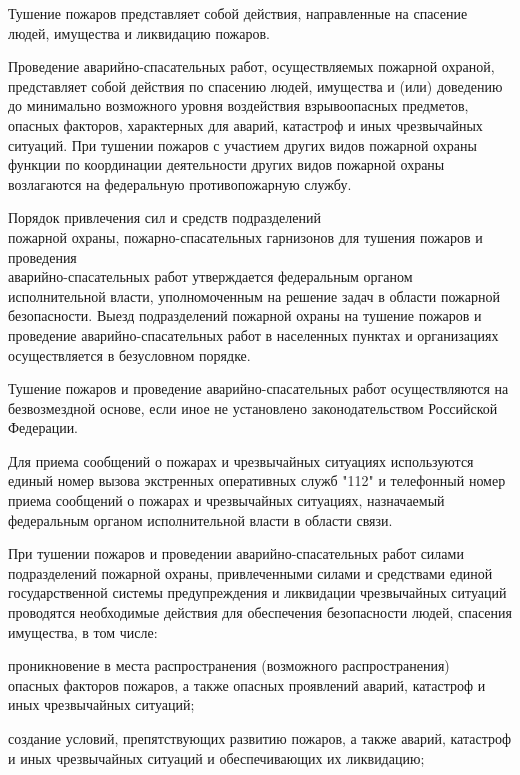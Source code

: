\documentclass[a4paper, 12pt]{article}
\theoremstyle{definition}
\begin{document}
        Тушение пожаров представляет собой действия, направленные на спасение людей, имущества и ликвидацию пожаров.

        Проведение аварийно-спасательных работ, осуществляемых пожарной охраной, представляет собой действия по спасению людей, имущества и (или) доведению до минимально возможного уровня воздействия взрывоопасных предметов, опасных факторов, характерных для аварий, катастроф и иных чрезвычайных ситуаций.
        При тушении пожаров с участием других видов пожарной охраны функции по координации деятельности других видов пожарной охраны возлагаются на федеральную противопожарную службу.

        Порядок привлечения сил и средств подразделений \\пожарной охраны, пожарно-спасательных гарнизонов для тушения пожаров и проведения\\ аварийно-спасательных работ утверждается федеральным органом исполнительной власти, уполномоченным на решение задач в области пожарной безопасности.
        Выезд подразделений пожарной охраны на тушение пожаров и проведение аварийно-спасательных работ в населенных пунктах и организациях осуществляется в безусловном порядке.

        Тушение пожаров и проведение аварийно-спасательных работ осуществляются на безвозмездной основе, если иное не установлено законодательством Российской Федерации.

        Для приема сообщений о пожарах и чрезвычайных ситуациях используются единый номер вызова экстренных оперативных служб "112" и телефонный номер приема сообщений о пожарах и чрезвычайных ситуациях, назначаемый федеральным органом исполнительной власти в области связи.

        При тушении пожаров и проведении аварийно-спасательных работ силами подразделений пожарной охраны, привлеченными силами и средствами единой государственной системы предупреждения и ликвидации чрезвычайных ситуаций проводятся необходимые действия для обеспечения безопасности людей, спасения имущества, в том числе:

        проникновение в места распространения (возможного распространения)\\ опасных факторов пожаров, а также опасных проявлений аварий, катастроф и иных чрезвычайных ситуаций;

        создание условий, препятствующих развитию пожаров, а также аварий, катастроф и иных чрезвычайных ситуаций и обеспечивающих их ликвидацию;
\end{document}
